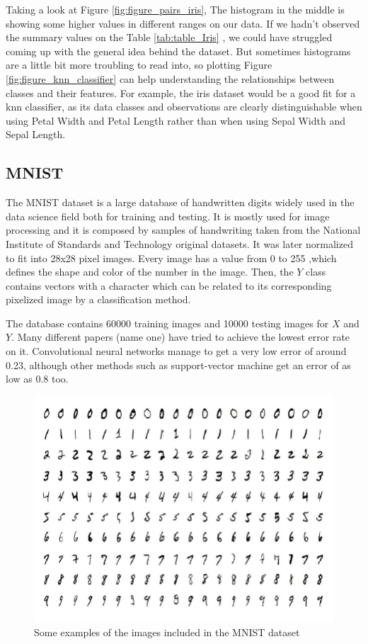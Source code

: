 Taking a look at Figure \ref{fig:figure_pairs_iris}, The histogram in the middle is showing some higher values in different ranges on our data. If we hadn't observed the summary values on the Table \ref{tab:table_Iris} , we could have struggled coming up with the general idea behind the dataset. But sometimes histograms are a little bit more troubling to read into, so plotting Figure \ref{fig:figure_knn_classifier} can help understanding the relationships between classes and their features. For example, the iris dataset would be a good fit for a knn classifier, as its data classes and observations are clearly distinguishable when using Petal Width and Petal Length rather than when using Sepal Width and Sepal Length. \par

\subsection{MNIST}

The MNIST dataset is a large database of handwritten digits widely used in the data science field both for training and testing. It is mostly used for image processing and it is composed by samples of handwriting taken from the National Institute of Standards and Technology original datasets. It was later normalized to fit into 28x28 pixel images. Every image has a value from 0 to 255 ,which defines the shape and color of the number in the image. Then, the $Y$ class contains vectors with a character which can be related to its corresponding pixelized image by a classification method. \par

The database contains 60000 training images and 10000 testing images for $X$ and $Y$. Many different papers (name one) have tried to achieve the lowest error rate on it. Convolutional neural networks manage to get a very low error of around 0.23, although other methods such as support-vector machine get an error of as low as 0.8 too.\par

\begin{figure}[H]
\centering
  \includegraphics[width=16cm]{Figuras_tfg/Figure_MNIST}
  \caption{Some examples of the images included in the MNIST dataset}
 \label{fig:figure_MNIST}
\end{figure}

